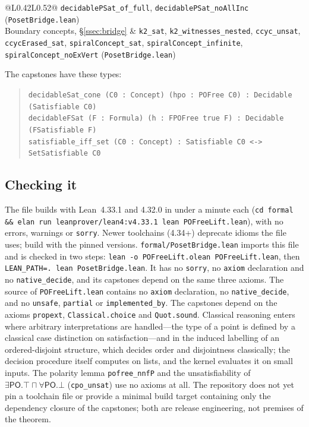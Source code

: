 \documentclass[11pt]{article}
\newcommand{\PO}{\mathsf{PO}}
\newcommand{\code}[1]{\texttt{#1}}
\theoremstyle{plain}
\theoremstyle{definition}
\begin{document}
\begin{table}[t]
\begin{tabular}{@{}L{0.42\textwidth}L{0.52\textwidth}@{}}
  \code{decidablePSat\_of\_full}, \code{decidablePSat\_noAllInc}
  (\texttt{PosetBridge.lean})\\
Boundary concepts, \S\ref{ssec:bridge} & \code{k2\_sat},
  \code{k2\_witnesses\_nested}, \code{ccyc\_unsat}, \code{ccycErased\_sat},
  \code{spiralConcept\_sat}, \code{spiralConcept\_infinite},
  \code{spiralConcept\_noExVert} (\texttt{PosetBridge.lean})\\
\bottomrule
\end{tabular}
\caption{Results and their Lean declarations, all in
\texttt{formal/POFreeLift.lean} unless marked. \texttt{PosetBridge.lean}
imports that file; the decidability of the two imported slices of
\S\ref{ssec:bridge} is not formalized.}
\label{tab:map}
\end{table}

The capstones have these types:
\begin{quote}\footnotesize
\code{decidableSat\_cone (C0 : Concept) (hpo : POFree C0) : Decidable (Satisfiable C0)}\\
\code{decidableFSat (F : Formula) (h : FPOFree true F) : Decidable (FSatisfiable F)}\\
\code{satisfiable\_iff\_set (C0 : Concept) : Satisfiable C0 <-> SetSatisfiable C0}
\end{quote}

\subsection{Checking it}

The file builds with Lean~4.33.1 and 4.32.0 in under a minute each
(\texttt{cd formal \&\& elan run leanprover/lean4:v4.33.1 lean
POFreeLift.lean}), with no errors, warnings or \texttt{sorry}. Newer
toolchains (4.34+) deprecate idioms the file uses; build with the pinned
versions. \texttt{formal/PosetBridge.lean} imports this file and is checked in
two steps: \texttt{lean -o POFreeLift.olean POFreeLift.lean}, then
\texttt{LEAN\_PATH=. lean PosetBridge.lean}. It has no \texttt{sorry}, no
\texttt{axiom} declaration and no \texttt{native\_decide}, and its capstones
depend on the same three axioms. The source of \texttt{POFreeLift.lean} contains no
\texttt{axiom} declaration, no \texttt{native\_decide}, and no \texttt{unsafe},
\texttt{partial} or \texttt{implemented\_by}. The capstones depend on the axioms
\texttt{propext}, \texttt{Classical.choice} and \texttt{Quot.sound}. Classical
reasoning enters where arbitrary interpretations are handled---the type of a
point is defined by a classical case distinction on satisfaction---and in the
induced labelling of an ordered-disjoint structure, which decides order and
disjointness classically; the decision procedure itself computes on lists, and
the kernel evaluates it on small inputs. The polarity lemma \code{pofree\_nnfP}
and the unsatisfiability of $\exists\PO.\top\sqcap\forall\PO.\bot$
(\code{cpo\_unsat}) use no axioms at all. The repository does not yet pin a toolchain file or provide a minimal
build target containing only the dependency closure of the capstones; both are
release engineering, not premises of the theorem.
\end{document}

